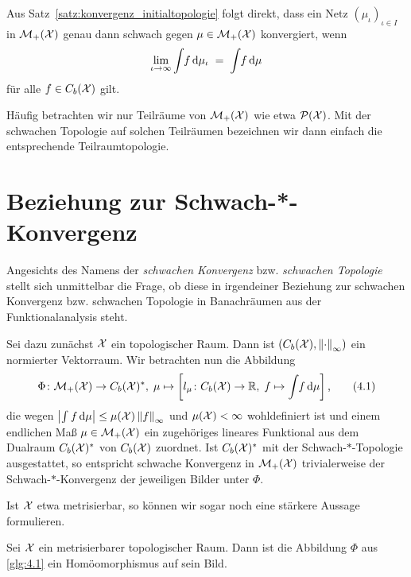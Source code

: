 \documentclass[../thesis/thesis.tex]{subfiles}
\begin{document}
	\begin{Bemerkung}
		Aus Satz~\ref{satz:konvergenz_initialtopologie} folgt direkt, dass ein Netz $(\mu_\iota)_{\iota \in I}$ in $\mathcal{M}_{+}(\mathcal{X})$ genau dann schwach gegen $\mu \in \mathcal{M}_{+}(\mathcal{X})$
		konvergiert, wenn
		\[ \lim_{\iota \to \infty} \int_{} \, f \, \mathrm{d}\mu_\iota \; = \; \int_{} \, f \, \mathrm{d}\mu \]
		für alle $f \in C_b(\mathcal{X})$ gilt.
	\end{Bemerkung}

	Häufig betrachten wir nur Teilräume von $\mathcal{M}_{+}(\mathcal{X})$ wie etwa $\mathcal{P}(\mathcal{X})$. Mit der schwachen Topologie auf solchen Teilräumen bezeichnen wir 
	dann einfach die entsprechende Teilraumtopologie.

	\section{Beziehung zur Schwach-*-Konvergenz}
	\label{subsec:beziehung_schwach-stern-konvergenz}
	
	Angesichts des Namens der \emph{schwachen Konvergenz} bzw. \emph{schwachen Topologie} stellt sich unmittelbar die Frage, ob diese in irgendeiner Beziehung zur schwachen Konvergenz bzw. schwachen Topologie in Banachräumen aus der 
	Funktionalanalysis steht.
	
	Sei dazu zunächst $\mathcal{X}$ ein topologischer Raum. Dann ist $(C_b(\mathcal{X}), \left\lVert\cdot\right\rVert_\infty)$ ein normierter Vektorraum. Wir betrachten nun die Abbildung
	\[\Phi \colon \mathcal{M}_{+}(\mathcal{X}) \to C_b(\mathcal{X})^\ast, \; \mu \mapsto \left[l_\mu \colon C_b(\mathcal{X}) \to \mathbb{R}, \; f \mapsto \int_{} \, f \, \mathrm{d}\mu \right]  \text{,} \label{glg:4.1} \tag{4.1}\]
	die wegen $\left| \int_{} \, f \, \mathrm{d}\mu \right| \leq \mu(\mathcal{X}) \left\lVert f\right\rVert_\infty$ und $\mu(\mathcal{X}) < \infty$ wohldefiniert ist 
	und einem endlichen Maß $\mu \in \mathcal{M}_{+}(\mathcal{X})$ ein zugehöriges lineares Funktional aus dem Dualraum $C_b(\mathcal{X})^\ast$ von $C_b(\mathcal{X})$ zuordnet. 
	Ist $C_b(\mathcal{X})^\ast$ mit der 
	Schwach-$\ast$-Topologie ausgestattet, so entspricht schwache Konvergenz in $\mathcal{M}_{+}(\mathcal{X})$ trivialerweise der 
	Schwach-$\ast$-Konvergenz der jeweiligen Bilder unter $\Phi$.
	
	Ist $\mathcal{X}$ etwa metrisierbar, so können wir sogar noch eine stärkere Aussage formulieren.
	
	\begin{Hilfssatz}
		Sei $\mathcal{X}$ ein metrisierbarer topologischer Raum. Dann ist die Abbildung $\Phi$ aus \eqref{glg:4.1} ein Homöomorphismus auf sein Bild.
	\end{Hilfssatz}
\end{document}
